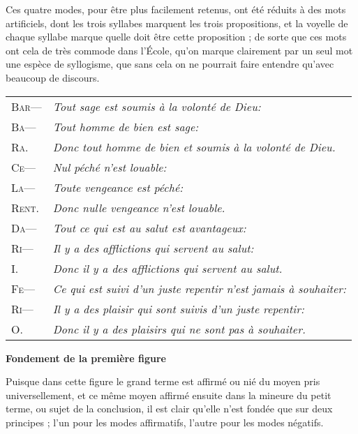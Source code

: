 Ces quatre modes, pour être plus facilement retenus, ont été réduits à des mots artificiels, dont les trois syllabes marquent les trois propositions, et la voyelle de chaque syllabe marque quelle doit être cette proposition ; de sorte que ces mots ont cela de très commode dans l'École, qu'on marque clairement par un seul mot une espèce de syllogisme, que sans cela on ne pourrait faire entendre qu'avec beaucoup de discours.

\begin{center}
	\begin{tabularx}{\textwidth}{lX}
		{\large\scshape Bar—} & \emph{Tout sage est soumis à la volonté de Dieu:}            \\
		{\large\scshape Ba—} & \emph{Tout homme de bien est sage:}                          \\
		{\large\scshape Ra.} & \emph{Donc tout homme de bien et soumis à la volonté de Dieu.} \\
		{\large\scshape Ce—} & \emph{Nul péché n'est louable:}                              \\
		{\large\scshape La—} & \emph{Toute vengeance est péché:}                            \\
		{\large\scshape Rent.} & \emph{Donc nulle vengeance n'est louable.}                   \\
		{\large\scshape Da—} & \emph{Tout ce qui est au salut est avantageux:}             \\
		{\large\scshape Ri—} & \emph{Il y a des afflictions qui servent au salut:}          \\
		{\large\scshape I.} & \emph{Donc il y a des afflictions qui servent au salut.}     \\
		{\large\scshape Fe—} & \emph{Ce qui est suivi d'un juste repentir n'est jamais à souhaiter:} \\
		{\large\scshape Ri—} & \emph{Il y a des plaisir qui sont suivis d'un juste repentir:} \\
		{\large\scshape O.} & \emph{Donc il y a des plaisirs qui ne sont pas à souhaiter.} \\
	\end{tabularx}
\end{center}

\bigbreak
\bigbreak
\bigbreak

\begin{center}{\bfseries Fondement de la première figure}\end{center}

Puisque dans cette figure le grand terme est affirmé ou nié du moyen pris universellement, et ce même moyen affirmé ensuite dans la mineure du petit terme, ou sujet de la conclusion, il est clair qu'elle n'est fondée que sur deux principes ; l'un pour les modes affirmatifs, l'autre pour les modes négatifs.

